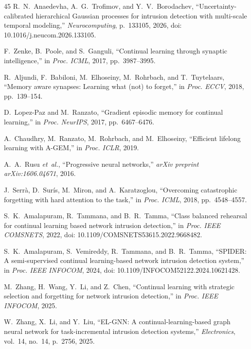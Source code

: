 \documentclass[journal]{IEEEtran}
\theoremstyle{definition}
\theoremstyle{remark}
\begin{document}
\begin{thebibliography}{45}
R.~N.~Anaedevha, A.~G.~Trofimov, and Y.~V.~Borodachev,
``Uncertainty-calibrated hierarchical {G}aussian processes for intrusion detection with multi-scale temporal modeling,''
\emph{Neurocomputing}, p.~133105, 2026, doi: 10.1016/j.neucom.2026.133105.

F.~Zenke, B.~Poole, and S.~Ganguli,
``Continual learning through synaptic intelligence,''
in \emph{Proc. ICML}, 2017, pp.~3987--3995.

R.~Aljundi, F.~Babiloni, M.~Elhoseiny, M.~Rohrbach, and T.~Tuytelaars,
``Memory aware synapses: Learning what (not) to forget,''
in \emph{Proc. ECCV}, 2018, pp.~139--154.

D.~Lopez-Paz and M.~Ranzato,
``Gradient episodic memory for continual learning,''
in \emph{Proc. NeurIPS}, 2017, pp.~6467--6476.

A.~Chaudhry, M.~Ranzato, M.~Rohrbach, and M.~Elhoseiny,
``Efficient lifelong learning with {A-GEM},''
in \emph{Proc. ICLR}, 2019.

A.~A.~Rusu \textit{et~al.},
``Progressive neural networks,''
\emph{arXiv preprint arXiv:1606.04671}, 2016.

J.~Serr\`{a}, D.~Sur\'{i}s, M.~Miron, and A.~Karatzoglou,
``Overcoming catastrophic forgetting with hard attention to the task,''
in \emph{Proc. ICML}, 2018, pp.~4548--4557.

S.~K.~Amalapuram, R.~Tammana, and B.~R.~Tamma,
``Class balanced rehearsal for continual learning based network intrusion detection,''
in \emph{Proc. IEEE COMSNETS}, 2022, doi: 10.1109/COMSNETS53615.2022.9668482.

S.~K.~Amalapuram, S.~Vemireddy, R.~Tammana, and B.~R.~Tamma,
``{SPIDER}: A semi-supervised continual learning-based network intrusion detection system,''
in \emph{Proc. IEEE INFOCOM}, 2024, doi: 10.1109/INFOCOM52122.2024.10621428.

M.~Zhang, H.~Wang, Y.~Li, and Z.~Chen,
``Continual learning with strategic selection and forgetting for network intrusion detection,''
in \emph{Proc. IEEE INFOCOM}, 2025.

W.~Zhang, X.~Li, and Y.~Liu,
``{EL-GNN}: A continual-learning-based graph neural network for task-incremental intrusion detection systems,''
\emph{Electronics}, vol.~14, no.~14, p.~2756, 2025.


\end{thebibliography}
\end{document}
